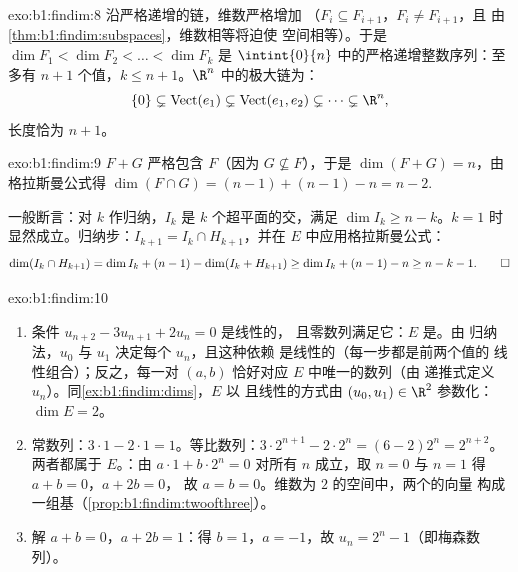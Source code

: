 \begin{solution}{exo:b1:findim:8}
沿严格递增的链，维数严格增加
（$F_i \subseteq F_{i+1}$，$F_i \neq F_{i+1}$，且
由\cref{thm:b1:findim:subspaces}，维数相等将迫使
空间相等）。于是 $\dim F_1 < \dim F_2 < \dots < \dim F_k$ 是
$\intint{0}{n}$ 中的严格递增整数序列：至多有
$n + 1$ 个值，$k \leq n + 1$。$\R^n$ 中的极大链为：
\[
\{0\} \subsetneq \operatorname{Vect}(e_1) \subsetneq
\operatorname{Vect}(e_1, e_2) \subsetneq \dots \subsetneq \R^n ,
\]
长度恰为 $n + 1$。
\end{solution}

\begin{solution}{exo:b1:findim:9}
$F + G$ 严格包含 $F$（因为 $G \not\subseteq F$），于是
$\dim(F + G) = n$，由格拉斯曼公式得 $\dim(F \cap G) = (n-1) +
(n-1) - n = n - 2$.

一般断言：对 $k$ 作归纳，$I_k$ 是 $k$
个超平面的交，满足 $\dim I_k \geq n - k$。$k = 1$ 时显然成立。归纳步：$I_{k+1}
= I_k \cap H_{k+1}$，并在 $E$ 中应用格拉斯曼公式：
\[
\dim(I_k \cap H_{k+1}) = \dim I_k + (n - 1) - \dim(I_k + H_{k+1})
\geq \dim I_k + (n-1) - n \geq n - k - 1 . \qedhere
\]
\end{solution}

\begin{solution}{exo:b1:findim:10}
\begin{enumerate}
  \item 条件 $u_{n+2} - 3u_{n+1} + 2u_n = 0$ 是线性的，
        且零数列满足它：$E$ 是。由
        归纳法，$u_0$ 与 $u_1$ 决定每个 $u_n$，且这种依赖
        是线性的（每一步都是前两个值的
        线性组合）；反之，每一对 $(a, b)$
        恰好对应 $E$ 中唯一的数列（由
        递推式定义 $u_n$）。同\cref{ex:b1:findim:dims}，$E$ 以
        且线性的方式由 $(u_0, u_1) \in
        \R^2$ 参数化：$\dim E = 2$。
  \item 常数列：$3\cdot1 - 2\cdot1 = 1$。等比数列：$3\cdot
        2^{n+1} - 2\cdot 2^n = (6 - 2)2^n = 2^{n+2}$。两者都属于
        $E$。：由 $a\cdot 1 + b\cdot 2^n = 0$ 对所有 $n$
        成立，取 $n = 0$ 与 $n = 1$ 得 $a + b = 0$，$a + 2b = 0$，
        故 $a = b = 0$。维数为 $2$ 的空间中，两个的向量
        构成一组基（\cref{prop:b1:findim:twoofthree}）。
  \item 解 $a + b = 0$，$a + 2b = 1$：得 $b = 1$，$a = -1$，故
        $u_n = 2^n - 1$（即梅森数列）。
\end{enumerate}
\end{solution}

